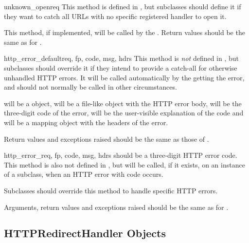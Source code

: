 \begin{methoddesc}[BaseHandler]{unknown_open}{req}
This method is  defined in , but
subclasses should define it if they want to catch all URLs with no
specific registered handler to open it.

This method, if implemented, will be called by the  
.  Return values should be the same as for 
.
\end{methoddesc}

\begin{methoddesc}[BaseHandler]{http_error_default}{req, fp, code, msg, hdrs}
This method is \emph{not} defined in , but
subclasses should override it if they intend to provide a catch-all
for otherwise unhandled HTTP errors.  It will be called automatically
by the   getting the error, and should not
normally be called in other circumstances.

 will be a  object,  will be a
file-like object with the HTTP error body,  will be the
three-digit code of the error,  will be the user-visible
explanation of the code and  will be a mapping object with
the headers of the error.

Return values and exceptions raised should be the same as those
of .
\end{methoddesc}

\begin{methoddesc}[BaseHandler]{http_error_}{req, fp, code, msg, hdrs}
 should be a three-digit HTTP error code.  This method is
also not defined in , but will be called, if it
exists, on an instance of a subclass, when an HTTP error with code
 occurs.

Subclasses should override this method to handle specific HTTP
errors.

Arguments, return values and exceptions raised should be the same as
for .
\end{methoddesc}

\subsection{HTTPRedirectHandler Objects \label{http-redirect-handler}}


